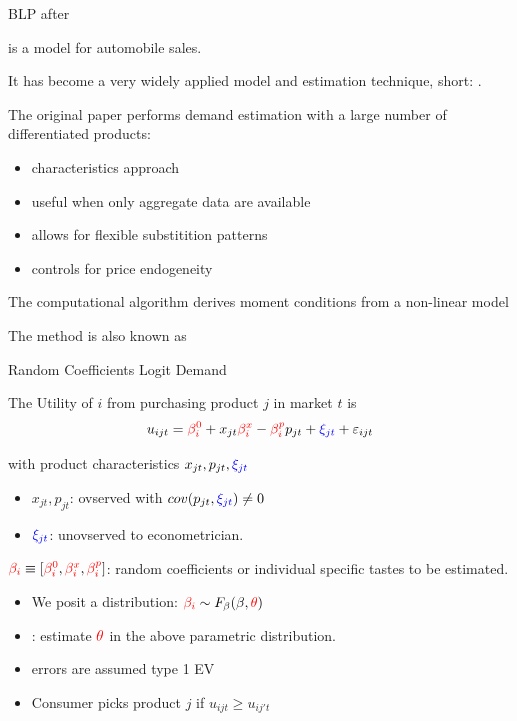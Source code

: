 \documentclass[english]{beamer}
\begin{document}
\begin{frame}{BLP after \cite{dube2012improving}}
\begin{midi}
\item \cite{BLP} is a model for automobile sales.
\item It has become a very widely applied model and estimation technique, short: .
\item The original paper performs demand estimation with a large number of differentiated products:
\begin{itemize}
\item characteristics approach
\item useful when only aggregate data are available
\item allows for flexible substitition patterns
\item controls for price endogeneity
\end{itemize}
\item The computational algorithm derives moment conditions from a non-linear model
\item The method is also known as  
\end{midi}
\end{frame}

\begin{frame}{Random Coefficients Logit Demand}
\begin{midi}
\item The Utility of $i$ from purchasing product $j$ in market $t$ is
\begin{equation}
u_{ijt} = {\color{red}{\beta_i^0}} + x_{jt}{\color{red}{\beta_i^x}} - {\color{red}{\beta_i^p}} p_{jt} + {\color{blue}{\xi_{jt}}} + \varepsilon_{ijt} \label{eq:demand}
\end{equation}
\item with product characteristics $x_{jt},p_{jt},{\color{blue}{\xi_{jt}}}$
\begin{itemize}
\item $x_{jt},p_{jt}$: ovserved with $cov(p_{jt},{\color{blue}{\xi_{jt}}})\neq 0$
\item ${\color{blue}{\xi_{jt}}}$: unovserved to econometrician.
\end{itemize}
\item ${\color{red}{\beta_i}} \equiv [{\color{red}{\beta_i^0}},{\color{red}{\beta_i^x}},{\color{red}{\beta_i^p}}]$: random coefficients or individual specific tastes to be estimated.
\begin{itemize}
\item We posit a distribution: ${\color{red}{\beta_i}} \sim F_\beta(\beta,{\color{red}{\theta}})$
\item {}: estimate ${\color{red}{\theta}}$ in the above parametric distribution.
\item errors are assumed type 1 EV
\item Consumer picks product $j$ if $u_{ijt}\geq u_{ij't}$
\end{itemize}
\end{midi}
\end{frame}
\end{document}
